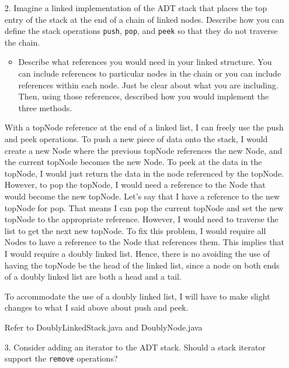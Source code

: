 \documentclass[10pt]{article}
\begin{document}
	\begin{enumerate}
		\item[2.] Imagine a linked implementation of the ADT stack that places the top entry of the stack at the end of a chain of linked nodes. Describe how you can define the stack operations \texttt{push}, \texttt{pop}, and \texttt{peek} so that they do not traverse the chain.
			
			\begin{itemize}
				\item Describe what references you would need in your linked structure. You can include references to particular nodes in the chain or you can include references within each node. Just be clear about what you are including. Then, using those references, described how you would implement the three methods.
			\end{itemize}
			
			\vspace{0.5cm}
			With a topNode reference at the end of a linked list, I can freely use the push and peek operations. To push a new piece of data onto the stack, I would create a new Node where the previous topNode references the new Node, and the current topNode becomes the new Node. To peek at the data in the topNode, I would just return the data in the node referenced by the topNode. However, to pop the topNode, I would need a reference to the Node that would become the new topNode. Let's say that I have a reference to the new topNode for pop. That means I can pop the current topNode and set the new topNode to the appropriate reference. However, I would need to traverse the list to get the next new topNode. To fix this problem, I would require all Nodes to have a reference to the Node that references them. This implies that I would require a doubly linked list. Hence, there is no avoiding the use of having the topNode be the head of the linked list, since a node on both ends of a doubly linked list are both a head and a tail.
			
			\vspace{0.5cm}
			To accommodate the use of a doubly linked list, I will have to make slight changes to what I said above about push and peek.
			
			\vspace{0.5cm}
			Refer to DoublyLinkedStack.java and DoublyNode.java
			\vspace{0.5cm}
		
		\item[3.] Consider adding an iterator to the ADT stack. Should a stack iterator support the \texttt{remove} operations?
			

\end{enumerate}
\end{document}
